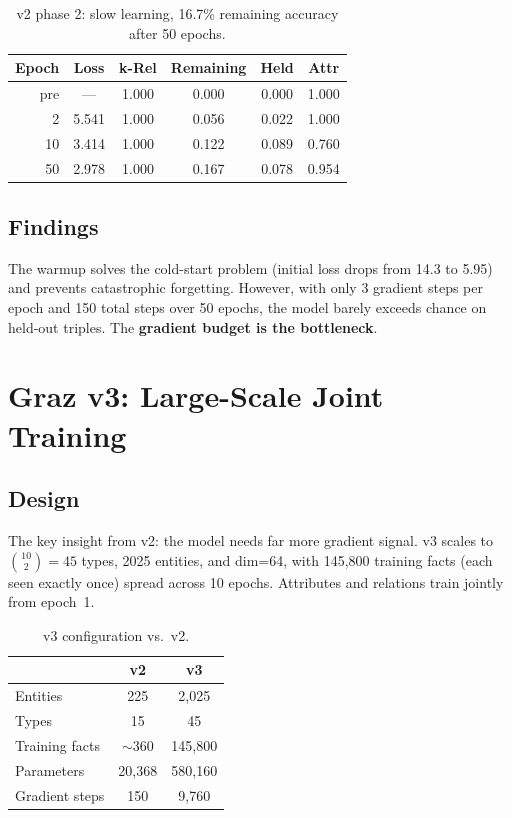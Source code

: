 \documentclass[11pt]{article}
\begin{document}
\begin{table}[h]
\centering
\caption{v2 phase 2: slow learning, 16.7\% remaining accuracy after 50 epochs.}
\begin{tabular}{rccccc}
\toprule
Epoch & Loss & k-Rel & Remaining & Held & Attr \\
\midrule
pre & --- & 1.000 & 0.000 & 0.000 & 1.000 \\
2 & 5.541 & 1.000 & 0.056 & 0.022 & 1.000 \\
10 & 3.414 & 1.000 & 0.122 & 0.089 & 0.760 \\
50 & 2.978 & 1.000 & 0.167 & 0.078 & 0.954 \\
\bottomrule
\end{tabular}
\end{table}

\subsection{Findings}

The warmup solves the cold-start problem (initial loss drops from 14.3 to 5.95)
and prevents catastrophic forgetting.  However, with only 3 gradient steps per epoch
and 150 total steps over 50 epochs, the model barely exceeds chance on held-out triples.
The \textbf{gradient budget is the bottleneck}.

\section{Graz v3: Large-Scale Joint Training}
\label{sec:v3}

\subsection{Design}

The key insight from v2: the model needs far more gradient signal.  v3 scales to
$\binom{10}{2} = 45$ types, 2025 entities, and dim=64, with 145,800 training facts
(each seen exactly once) spread across 10 epochs.  Attributes and relations train
jointly from epoch~1.

\begin{table}[h]
\centering
\caption{v3 configuration vs.\ v2.}
\begin{tabular}{lcc}
\toprule
& v2 & v3 \\
\midrule
Entities & 225 & 2,025 \\
Types & 15 & 45 \\
Training facts & $\sim$360 & 145,800 \\
Parameters & 20,368 & 580,160 \\
Gradient steps & 150 & 9,760 \\
\bottomrule
\end{tabular}
\end{table}
\end{document}
